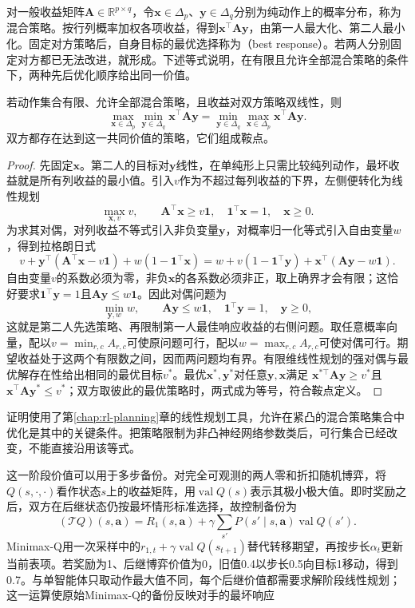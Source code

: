 对一般收益矩阵$\bm A\in\mathbb R^{p\times q}$，令$\bm x\in\Delta_p$、$\bm y\in\Delta_q$分别为纯动作上的概率分布，称为混合策略。按行列概率加权各项收益，得到$\bm x^\top\bm A\bm y$，由第一人最大化、第二人最小化。固定对方策略后，自身目标的最优选择称为（best response）。若两人分别固定对方都已无法改进，就形成。下述等式说明，在有限且允许全部混合策略的条件下，两种先后优化顺序给出同一价值。

\begin{theorem}[有限零和博弈的极小极大等式]
\label{thm:rl-multi-agent-minimax}
若动作集合有限、允许全部混合策略，且收益对双方策略双线性，则
\[
 \max_{\bm x\in\Delta_p}\min_{\bm y\in\Delta_q}
 \bm x^\top\bm A\bm y
 =
 \min_{\bm y\in\Delta_q}\max_{\bm x\in\Delta_p}
 \bm x^\top\bm A\bm y.
\]
双方都存在达到这一共同价值的策略，它们组成鞍点。
\end{theorem}
\begin{proof}
先固定$\bm x$。第二人的目标对$\bm y$线性，在单纯形上只需比较纯列动作，最坏收益就是所有列收益的最小值。引入$v$作为不超过每列收益的下界，左侧便转化为线性规划
\[
 \max_{\bm x,v}v,\qquad
 \bm A^\top\bm x\geq v\bm 1,\quad
 \bm 1^\top\bm x=1,\quad \bm x\geq0.
\]
为求其对偶，对列收益不等式引入非负变量$\bm y$，对概率归一化等式引入自由变量$w$，得到拉格朗日式
\[
 v+\bm y^\top(\bm A^\top\bm x-v\bm1)
       +w(1-\bm1^\top\bm x)
 =w+v(1-\bm1^\top\bm y)
       +\bm x^\top(\bm A\bm y-w\bm1).
\]
自由变量$v$的系数必须为零，非负$\bm x$的各系数必须非正，取上确界才会有限；这恰好要求$\bm1^\top\bm y=1$且$\bm A\bm y\leq w\bm1$。因此对偶问题为
\[
 \min_{\bm y,w}w,\qquad
 \bm A\bm y\leq w\bm1,\quad
 \bm1^\top\bm y=1,\quad \bm y\geq0,
\]
这就是第二人先选策略、再限制第一人最佳响应收益的右侧问题。取任意概率向量，配以$v=\min_{r,c}A_{r,c}$可使原问题可行，配以$w=\max_{r,c}A_{r,c}$可使对偶可行。期望收益处于这两个有限数之间，因而两问题均有界。有限维线性规划的强对偶与最优解存在性给出相同的最优目标$v^*$。最优$\bm x^*,\bm y^*$对任意$\bm y,\bm x$满足
$\bm x^{*\top}\bm A\bm y\geq v^*$且$\bm x^\top\bm A\bm y^*\leq v^*$；双方取彼此的最优策略时，两式成为等号，符合鞍点定义。
\end{proof}

证明使用了第\ref{chap:rl-planning}章的线性规划工具，允许在紧凸的混合策略集合中优化是其中的关键条件。把策略限制为非凸神经网络参数类后，可行集合已经改变，不能直接沿用该等式。

这一阶段价值可以用于多步备份。对完全可观测的两人零和折扣随机博弈，将$Q(s,\cdot,\cdot)$看作状态$s$上的收益矩阵，用$\operatorname{val}Q(s)$表示其极小极大值。即时奖励之后，双方在后继状态仍按最坏情形标准选择，故控制备份为
\begin{equation}
 (\mathcal T Q)(s,\bm a)
 =R_1(s,\bm a)+\gamma\sum_{s'}P(s'\mid s,\bm a)
           \operatorname{val}Q(s').
 \label{eq:rl-multi-agent-minimax-backup}
\end{equation}
Minimax-Q用一次采样中的$r_{1,t}+\gamma\operatorname{val}Q(s_{t+1})$替代转移期望，再按步长$\alpha_t$更新当前表项。若奖励为1、后继博弈价值为0，旧值0.4以步长0.5向目标1移动，得到0.7。与单智能体只取动作最大值不同，每个后继价值都需要求解阶段线性规划；这一运算使原始Minimax-Q的备份反映对手的最坏响应


